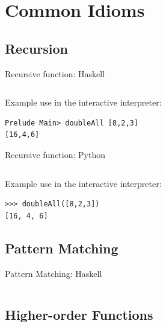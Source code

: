 \documentclass{beamer}
\begin{document}
\section{Common Idioms}
\subsection{Recursion}

\begin{frame}[fragile]{Recursive function: Haskell}

  \inputminted[fontsize=\Large,lastline=3]{haskell}{code/haskell/doubleall_recursion.hs}

  \vskip5mm

Example use in the interactive interpreter:
  \begin{verbatim}
Prelude Main> doubleAll [8,2,3]
[16,4,6]
  \end{verbatim}

\end{frame}

\begin{frame}[fragile]{Recursive function: Python}

  \inputminted[fontsize=\large,firstline=3,lastline=9]{python}{code/python/doubleall_recursion.py}

  \vskip5mm

Example use in the interactive interpreter:

  \begin{verbatim}
>>> doubleAll([8,2,3])
[16, 4, 6]
  \end{verbatim}

\end{frame}

\subsection{Pattern Matching}

\begin{frame}{Pattern Matching: Haskell}

  \inputminted[fontsize=\Large,lastline=3]{haskell}{code/haskell/doubleall_recursion.hs}

\end{frame}

\subsection{Higher-order Functions}
\end{document}
